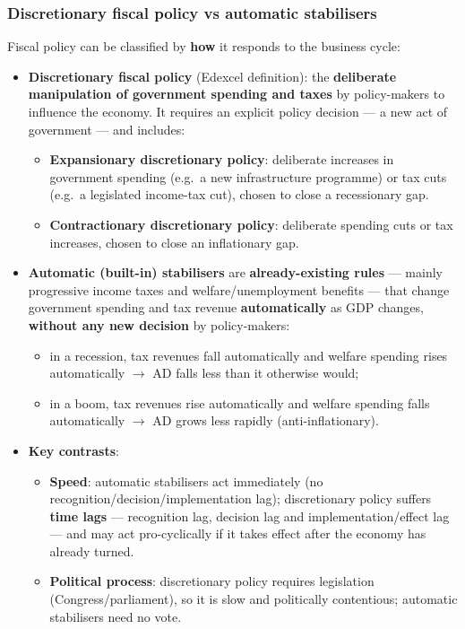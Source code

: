 \documentclass[a4paper,12pt]{article}
\newcommand{\needbold}[1]{\textcolor{red!70!black}{\textbf{#1}}}
\begin{document}
\subsubsection*{Discretionary fiscal policy vs automatic stabilisers}
Fiscal policy can be classified by \textbf{how} it responds to the business cycle:
\begin{itemize}
  \item \needbold{Discretionary fiscal policy} (Edexcel definition): the \textbf{deliberate manipulation of government spending and taxes} by policy-makers to influence the economy. It requires an explicit policy decision --- a new act of government --- and includes:
  \begin{itemize}
    \item \textbf{Expansionary discretionary policy}: deliberate increases in government spending (e.g.\ a new infrastructure programme) or tax cuts (e.g.\ a legislated income-tax cut), chosen to close a recessionary gap.
    \item \textbf{Contractionary discretionary policy}: deliberate spending cuts or tax increases, chosen to close an inflationary gap.
  \end{itemize}
  \item \needbold{Automatic (built-in) stabilisers} are \textbf{already-existing rules} --- mainly progressive income taxes and welfare/unemployment benefits --- that change government spending and tax revenue \textbf{automatically} as GDP changes, \textbf{without any new decision} by policy-makers:
  \begin{itemize}
    \item in a recession, tax revenues fall automatically and welfare spending rises automatically $\to$ AD falls less than it otherwise would;
    \item in a boom, tax revenues rise automatically and welfare spending falls automatically $\to$ AD grows less rapidly (anti-inflationary).
  \end{itemize}
  \item \textbf{Key contrasts}:
  \begin{itemize}
    \item \textbf{Speed}: automatic stabilisers act immediately (no recognition/decision/implementation lag); discretionary policy suffers \textbf{time lags} --- recognition lag, decision lag and implementation/effect lag --- and may act pro-cyclically if it takes effect after the economy has already turned.
    \item \textbf{Political process}: discretionary policy requires legislation (Congress/parliament), so it is slow and politically contentious; automatic stabilisers need no vote.

\end{itemize}
\end{itemize}
\end{document}
